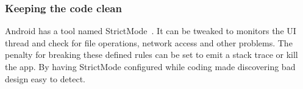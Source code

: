 \subsubsection{Keeping the code clean}

Android has a tool named StrictMode~\cite{androidStrictMode}. It can be tweaked to monitors the UI thread and check for file operations, network access and other problems. The penalty for breaking these defined rules can be set to emit a stack trace or kill the app. By having StrictMode configured while coding made discovering bad design easy to detect. 

